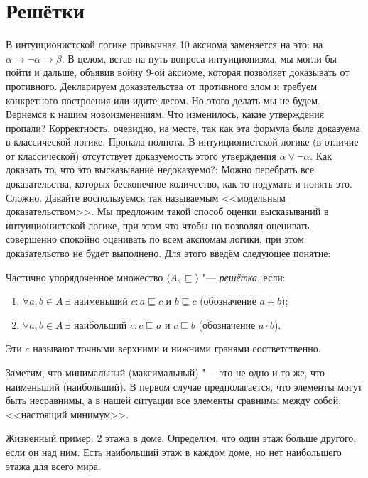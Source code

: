 \section{Решётки}
\author{ruperson}
В интуиционистской логике привычная 10 аксиома заменяется на это:
на $\alpha \rightarrow \neg \alpha \rightarrow \beta$.
В целом, встав на путь вопроса интуиционизма, мы могли бы пойти и дальше, объявив войну 9-ой аксиоме, которая позволяет доказывать от противного. Декларируем доказательства от противного злом и требуем конкретного построения или идите лесом. Но этого делать мы не будем.
Вернемся к нашим новоизменениям. Что изменилось, какие утверждения пропали? Корректность, очевидно, на месте, так как эта формула была доказуема в классической логике. Пропала полнота.
В интуиционистской логике (в отличие от классической) отсутствует доказуемость этого утверждения $\alpha \vee \neg \alpha $.
Как доказать то, что это высказывание недоказуемо?:  Можно перебрать все доказательства, которых бесконечное количество, как-то подумать и понять это. Сложно. Давайте воспользуемся так называемым <<модельным доказательством>>. Мы предложим такой способ оценки высказываний в интуиционистской логике, при этом что чтобы но позволял оценивать совершенно спокойно оценивать по всем аксиомам логики, при этом доказательство не будет выполнено. Для этого введём следующее понятие:

\begin{definition} Частично упорядоченное множество $\langle{}A, \sqsubseteq  \rangle$ "---  \emph{решётка}, если:
	
	\begin{enumerate}
		\item $\forall a,b \in A ~ \exists$ наименьший $c: a \sqsubseteq c$ и $b \sqsubseteq c $ (обозначение $a+b$);
		\item $\forall a,b \in A ~ \exists$ наибольший $c: c \sqsubseteq a$ и $c \sqsubseteq b$ (обозначение $a \cdot b$).
	\end{enumerate}
Эти $c$ называют точными верхними и нижними гранями соответственно.
\end{definition}
Заметим, что минимальный (максимальный) "--- это не одно и то же, что наименьший (наибольший). В первом случае предполагается, что элементы могут быть несравнимы, а в нашей ситуации все элементы сравнимы между собой, <<настоящий минимум>>. 

Жизненный пример: 2 этажа в доме. Определим, что один этаж больше другого, если он над ним. Есть наибольший этаж в каждом доме, но нет наибольшего этажа для всего мира.


